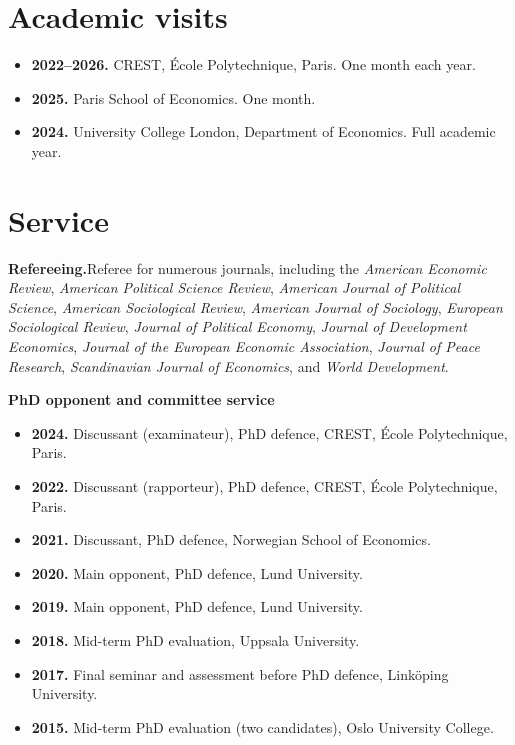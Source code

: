 \documentclass[11pt]{article}
\begin{document}
\section{Academic visits}
\begin{itemize}
  \item \textbf{2022--2026.} CREST, École Polytechnique, Paris. One month each year.
  \item \textbf{2025.} Paris School of Economics. One month.
  \item \textbf{2024.} University College London, Department of Economics. Full academic year.
\end{itemize}

\section{Service}
\textbf{Refereeing.}\quad Referee for numerous journals, including the \textit{American Economic Review},
\textit{American Political Science Review}, \textit{American Journal of Political Science},
\textit{American Sociological Review}, \textit{American Journal of Sociology},
\textit{European Sociological Review}, \textit{Journal of Political Economy},
\textit{Journal of Development Economics}, \textit{Journal of the European Economic Association},
\textit{Journal of Peace Research}, \textit{Scandinavian Journal of Economics}, and \textit{World Development}.

\vspace{0.7em}
\textbf{PhD opponent and committee service}
\begin{itemize}
  \item \textbf{2024.} Discussant (examinateur), PhD defence, CREST, École Polytechnique, Paris.
  \item \textbf{2022.} Discussant (rapporteur), PhD defence, CREST, École Polytechnique, Paris.
  \item \textbf{2021.} Discussant, PhD defence, Norwegian School of Economics.
  \item \textbf{2020.} Main opponent, PhD defence, Lund University.
  \item \textbf{2019.} Main opponent, PhD defence, Lund University.
  \item \textbf{2018.} Mid-term PhD evaluation, Uppsala University.
  \item \textbf{2017.} Final seminar and assessment before PhD defence, Linköping University.
  \item \textbf{2015.} Mid-term PhD evaluation (two candidates), Oslo University College.
\end{itemize}
\end{document}
